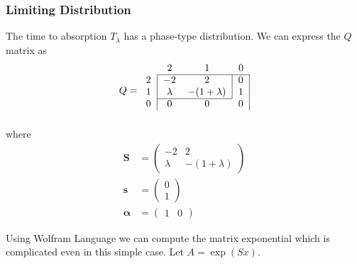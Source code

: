 \documentclass{article}
\theoremstyle{plain}
\theoremstyle{definition}
\theoremstyle{remark}
\numberwithin{equation}{section}
\begin{document}
\subsubsection{Limiting Distribution}

The time to absorption $T_\lambda$ has a phase-type distribution.
We can express the $Q$ matrix as
$$
Q = \begin{blockarray}{cccc}
    & 2 & 1 & 0\\
    \cline{2-4}
    \begin{block}{c|cc|c|}
        2 & -2 & 2 & 0\\
        1 & \lambda & - (1 + \lambda) & 1\\
        \cline{2-3}
    \end{block}
    \begin{block}{c|ccc|}
        0 & 0 & 0 & 0\\
    \end{block}
\end{blockarray}
$$
where
\begin{align*}
    \mathbf{S} &= \begin{pmatrix}
        -2 & 2\\
        \lambda & - (1 + \lambda)
    \end{pmatrix}\\
    \mathbf{s} &= \begin{pmatrix}
        0\\
        1
    \end{pmatrix}\\
    \boldsymbol{\alpha} &= \begin{pmatrix}
    1 & 0
    \end{pmatrix}
\end{align*}


Using Wolfram Language we can compute the matrix exponential which is complicated even in this simple case. Let $A = \exp(Sx)$.
\end{document}
